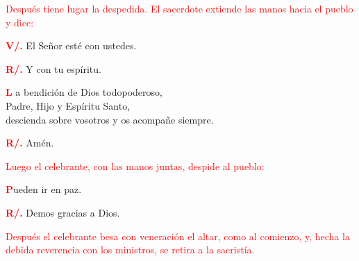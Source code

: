 \documentclass[12pt, letterpaper]{report}
\begin{document}
\large{\textcolor{red}{Despu\'es tiene lugar la despedida. El sacerdote extiende las manos hacia el pueblo y dice:}}

\noindent
\Large {\bfseries \textcolor{red}{V/.}} \hspace{0.5cm} El Se\~nor est\'e con ustedes.

\noindent
\Large {\bfseries \textcolor{red}{R/.}} \hspace{0.5cm} Y con tu esp\'iritu.

\lettrine[lines=1]{\bfseries \textcolor{red}{L}}{} \Large a bendici\'on de Dios todopoderoso, \\
Padre, Hijo \Huge{\textcolor{red}{}} \Large y Esp\'iritu Santo, \\
descienda sobre vosotros y os acompa\~ne siempre.

\noindent
\Large {\bfseries \textcolor{red}{R/.}} \hspace{0.5cm} Am\'en.

\large{\textcolor{red}{Luego el celebrante, con las manos juntas, despide al pueblo:}}

\lettrine[lines=1]{\bfseries \textcolor{red}{P}}{}\Large ueden ir en paz.

\noindent
\Large {\bfseries \textcolor{red}{R/.}} \hspace{0.5cm} Demos gracias a Dios.

\large{\textcolor{red}{Despu\'es el celebrante besa con veneraci\'on el altar, como al comienzo, y, hecha la debida reverencia con los ministros, se retira a la sacrist\'ia.}}

\end{document}
